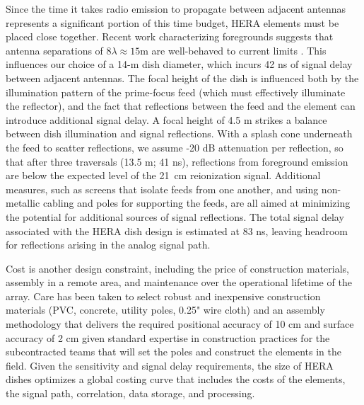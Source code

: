 \documentclass[preprint]{aastex}
\begin{document}
Since the time it takes radio emission to propagate between adjacent antennas 
represents a significant portion of this time budget, HERA elements must be placed close together.
Recent work characterizing foregrounds suggests that 
antenna separations of $8\lambda \approx 15$m are
well-behaved to current limits \citep{pober_et_al2013,parsons_et_al2013}. This influences our
choice of a 14-m dish diameter,
which incurs 42 ns of signal delay between adjacent antennas.
The focal height of the dish is influenced both by the illumination pattern of the prime-focus
feed (which must effectively illuminate the reflector), and the fact that reflections
between the feed and the element%
can introduce additional signal delay.  A focal height of 4.5 m
strikes a balance between dish illumination and signal reflections.  
With a splash cone underneath the feed to scatter reflections, we assume -20 dB
attenuation per reflection, so that after three traversals (13.5 m; 41 ns), reflections from
foreground emission are below the expected level of the 21~cm reionization signal.
Additional measures, such as screens that isolate feeds from one another, and using
non-metallic cabling and poles for supporting the feeds, are all aimed at minimizing
the potential for additional sources of signal reflections.
The total signal delay associated with the HERA dish design is estimated at 83 ns, leaving
headroom for reflections arising in the analog signal path.

Cost is another design constraint, including the price of construction
materials, assembly in a remote area, and maintenance over the operational
lifetime of the array.  Care has been taken to select robust and inexpensive
construction materials (PVC, concrete, utility poles, 0.25" wire cloth) and an assembly methodology that delivers the required positional
accuracy of 10 cm and surface accuracy of 2 cm given standard expertise in construction
practices for the subcontracted teams that will set the poles and construct the
elements in the field.  
Given the sensitivity and signal delay requirements, the size of HERA
dishes optimizes a global costing curve that includes the costs of the elements,
the signal path, correlation, data storage, and processing.

\end{document}
